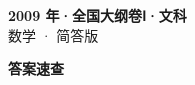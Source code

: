 \documentclass[zihao=-4, a4paper]{ctexart}
\begin{document}
\begin{center}
  {\Large\bfseries 2009 年·全国大纲卷Ⅰ·文科}\\[4pt]
  {\large 数学 · 简答版}
\end{center}
\medskip
{}

\clearpage
{}
\begin{center}{\Large\bfseries 答案速查}\end{center}
\medskip

\end{document}
